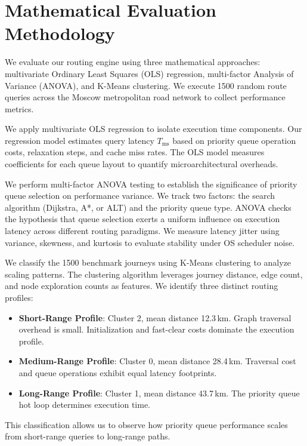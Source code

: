 \section{Mathematical Evaluation Methodology}
\label{sec:methodology}

We evaluate our routing engine using three mathematical approaches: multivariate Ordinary Least Squares (OLS) regression, multi-factor Analysis of Variance (ANOVA), and K-Means clustering. 
We execute 1500 random route queries across the Moscow metropolitan road network to collect performance metrics. 

We apply multivariate OLS regression to isolate execution time components. 
Our regression model estimates query latency $T_{\text{ms}}$ based on priority queue operation costs, relaxation steps, and cache miss rates. 
The OLS model measures coefficients for each queue layout to quantify microarchitectural overheads. 

We perform multi-factor ANOVA testing to establish the significance of priority queue selection on performance variance. 
We track two factors: the search algorithm (Dijkstra, A*, or ALT) and the priority queue type. 
ANOVA checks the hypothesis that queue selection exerts a uniform influence on execution latency across different routing paradigms. 
We measure latency jitter using variance, skewness, and kurtosis to evaluate stability under OS scheduler noise.

We classify the 1500 benchmark journeys using K-Means clustering to analyze scaling patterns. 
The clustering algorithm leverages journey distance, edge count, and node exploration counts as features. 
We identify three distinct routing profiles:
\begin{itemize}
\item \textbf{Short-Range Profile}: Cluster 2, mean distance 12.3\,km. Graph traversal overhead is small. Initialization and fast-clear costs dominate the execution profile.
\item \textbf{Medium-Range Profile}: Cluster 0, mean distance 28.4\,km. Traversal cost and queue operations exhibit equal latency footprints. 
\item \textbf{Long-Range Profile}: Cluster 1, mean distance 43.7\,km. The priority queue hot loop determines execution time.
\end{itemize}
This classification allows us to observe how priority queue performance scales from short-range queries to long-range paths.
